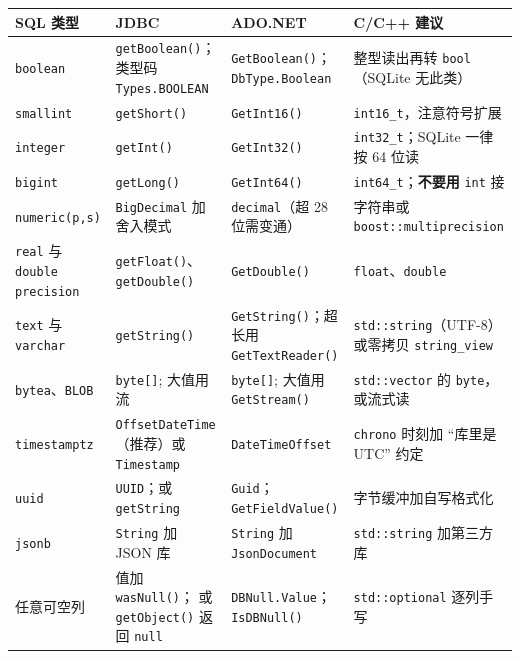 \documentclass[12pt,a4paper,fontset=fandol]{ctexbook}
\newcommand{\Fn}[1]{\texttt{#1()}}
\newcommand{\Tp}[1]{\texttt{#1}}
\newcommand{\CppJava}{C/C++}
\begin{document}
\begin{footnotesize}
\begin{longtable}{@{}>{\raggedright\arraybackslash}p{}
                  >{\raggedright\arraybackslash}p{}
                  >{\raggedright\arraybackslash}p{}
                  >{\raggedright\arraybackslash}p{}@{}}
\toprule
\textbf{SQL 类型} & \textbf{JDBC} & \textbf{ADO.NET} &
\textbf{\CppJava{} 建议} \\
\midrule
\texttt{boolean} & \Fn{getBoolean}；类型码
\Tp{Types.BOOLEAN} & \Fn{GetBoolean}；\Tp{DbType.Boolean} &
整型读出再转 \Tp{bool}（SQLite 无此类） \\
\addlinespace
\texttt{smallint} & \Fn{getShort} & \Fn{GetInt16} &
\Tp{int16\_t}，注意符号扩展 \\
\addlinespace
\texttt{integer} & \Fn{getInt} & \Fn{GetInt32} &
\Tp{int32\_t}；SQLite 一律按 64 位读 \\
\addlinespace
\texttt{bigint} & \Fn{getLong} & \Fn{GetInt64} &
\Tp{int64\_t}；\textbf{不要用} \Tp{int} 接 \\
\addlinespace
\texttt{numeric(p,s)} & \Tp{BigDecimal} 加舍入模式 &
\Tp{decimal}（超 28 位需变通） &
字符串或 \Tp{boost::\allowbreak multiprecision} \\
\addlinespace
\texttt{real} 与 \texttt{double precision} &
\Fn{getFloat}、\Fn{getDouble} & \Fn{GetDouble} &
\Tp{float}、\Tp{double} \\
\addlinespace
\texttt{text} 与 \texttt{varchar} & \Fn{getString} &
\Fn{GetString}；超长用 \Fn{GetTextReader} &
\Tp{std::string}（UTF-8）或零拷贝 \Tp{string\_view} \\
\addlinespace
\texttt{bytea}、\texttt{BLOB} & \Tp{byte[]}; 大值用流 &
\Tp{byte[]}; 大值用 \Fn{GetStream} &
\Tp{std::vector} 的 \Tp{byte}，或流式读 \\
\addlinespace
\texttt{timestamptz} & \Tp{OffsetDateTime}（推荐）或
\Tp{Timestamp} & \Tp{DateTimeOffset} &
\Tp{chrono} 时刻加 ``库里是 UTC'' 约定 \\
\addlinespace
\texttt{uuid} & \Tp{UUID}；或 \Tp{getString} &
\Tp{Guid}；\Fn{GetFieldValue} & 16 字节缓冲加自写格式化 \\
\addlinespace
\texttt{jsonb} & \Tp{String} 加 JSON 库 &
\Tp{String} 加 \Tp{JsonDocument} & \Tp{std::string} 加第三方库 \\
\addlinespace
任意可空列 & 值加 \Fn{wasNull}；
或 \Fn{getObject} 返回 \Tp{null} &
\Tp{DBNull.Value}；\Fn{IsDBNull} &
\Tp{std::optional} 逐列手写 \\
\bottomrule
\end{longtable}
\end{footnotesize}
\end{document}
